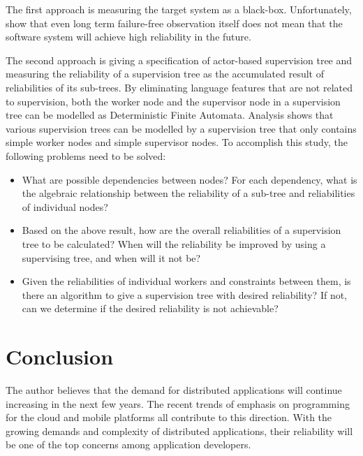 The first approach is measuring the target system as a black-box.  
Unfortunately, \citet{Littlewood93} show that even long term failure-free 
observation itself does not mean that the software system will achieve high 
reliability in the future.  

The second approach is giving a specification of actor-based supervision tree 
and measuring the reliability of a supervision tree as the accumulated result 
of reliabilities of its sub-trees. 
By eliminating language features that are not related to supervision, both the worker 
node and the supervisor node in a supervision tree can be modelled as  
Deterministic Finite Automata.  Analysis shows that various
supervision trees can be modelled by a supervision tree that only contains 
simple worker nodes and simple supervisor nodes. 
To accomplish this study, the following problems need to be solved:
\begin{itemize}
  \item What are possible dependencies between nodes? For each dependency,
what is the algebraic relationship between the reliability of a sub-tree
and reliabilities of individual nodes?
  \item Based on the above result, how are the overall reliabilities
of a supervision tree to be calculated? When will the reliability be improved 
by using a supervising tree, and when will it not be?
  \item Given the reliabilities of individual workers and constraints between
them, is there an algorithm to give a supervision tree with desired 
reliability?  If not, can we determine if the desired reliability is not
achievable?
\end{itemize}

\section{Conclusion}

The author believes that the demand for distributed applications will continue 
increasing in the next few years.  The recent trends of emphasis on programming 
for the cloud and mobile platforms all contribute to this direction.  With the 
growing demands and complexity of distributed applications, their reliability 
will be one of the top concerns among application developers. 


